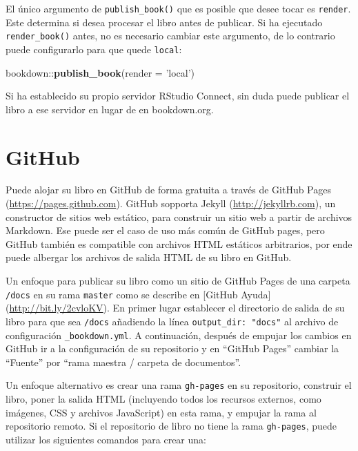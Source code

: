 \documentclass[12pt,]{krantz}
\makeatletter
\newenvironment{Shaded}{\begin{snugshade}}{\end{snugshade}}
\newcommand{\KeywordTok}[1]{\textcolor[rgb]{0.13,0.29,0.53}{\textbf{{#1}}}}
\newcommand{\DataTypeTok}[1]{\textcolor[rgb]{0.13,0.29,0.53}{{#1}}}
\newcommand{\StringTok}[1]{\textcolor[rgb]{0.31,0.60,0.02}{{#1}}}
\newcommand{\NormalTok}[1]{{#1}}
\newenvironment{kframe}{%
\medskip{}
\setlength{\fboxsep}{.8em}
 \def\at@end@of@kframe{}%
 \ifinner\ifhmode%
  \def\at@end@of@kframe{\end{minipage}}%
  \begin{minipage}{\columnwidth}%
 \fi\fi%
 \def\FrameCommand##1{\hskip\@totalleftmargin \hskip-\fboxsep
 \colorbox{shadecolor}{##1}\hskip-\fboxsep
     \hskip-\linewidth \hskip-\@totalleftmargin \hskip\columnwidth}%
 \MakeFramed {\advance\hsize-\width
   \@totalleftmargin\z@ \linewidth\hsize
   \@setminipage}}%
 {\par\unskip\endMakeFramed%
 \at@end@of@kframe}
\renewenvironment{Shaded}{\begin{kframe}}{\end{kframe}}
\theoremstyle{definition}
\theoremstyle{definition}
\theoremstyle{remark}
\makeatother
\begin{document}
El único argumento de \texttt{publish\_book()} que es posible que desee
tocar es \texttt{render}. Este determina si desea procesar el libro
antes de publicar. Si ha ejecutado \texttt{render\_book()} antes, no es
necesario cambiar este argumento, de lo contrario puede configurarlo
para que quede \texttt{\textquotesingle{}local\textquotesingle{}}:

\begin{Shaded}
\begin{Highlighting}[]
\NormalTok{bookdown::}\KeywordTok{publish_book}\NormalTok{(}\DataTypeTok{render =} \StringTok{'local'}\NormalTok{)}
\end{Highlighting}
\end{Shaded}

Si ha establecido su propio servidor RStudio Connect, sin duda puede
publicar el libro a ese servidor en lugar de en bookdown.org.

\section{GitHub}\label{github}

Puede alojar su libro en GitHub  de forma gratuita a
través de GitHub Pages (\url{https://pages.github.com}). GitHub sopporta
Jekyll (\url{http://jekyllrb.com}), un constructor de sitios web
estático, para construir un sitio web a partir de archivos Markdown. Ese
puede ser el caso de uso más común de GitHub pages, pero GitHub también
es compatible con archivos HTML estáticos arbitrarios, por ende puede
albergar los archivos de salida HTML de su libro en GitHub.

Un enfoque para publicar su libro como un sitio de GitHub Pages de una
carpeta \texttt{/docs} en su rama \texttt{master} como se describe en
{[}GitHub Ayuda{]} (\url{http://bit.ly/2cvloKV}). En primer lugar
establecer el directorio de salida de su libro para que sea
\texttt{/docs} añadiendo la línea \texttt{output\_dir:\ "docs"} al
archivo de configuración \texttt{\_bookdown.yml}. A continuación,
después de empujar los cambios en GitHub ir a la configuración de su
repositorio y en ``GitHub Pages'' cambiar la ``Fuente'' por ``rama
maestra / carpeta de documentos''.

Un enfoque alternativo es crear una rama \texttt{gh-pages} en su
repositorio, construir el libro, poner la salida HTML (incluyendo todos
los recursos externos, como imágenes, CSS y archivos JavaScript) en esta
rama, y empujar la rama al repositorio remoto. Si el repositorio de
libro no tiene la rama \texttt{gh-pages}, puede utilizar los siguientes
comandos para crear una:
\end{document}
